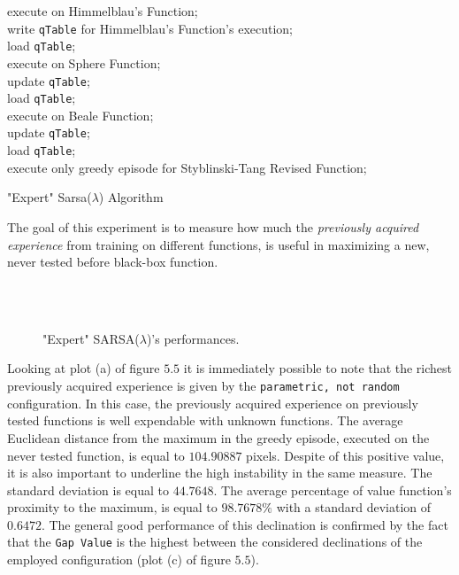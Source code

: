 \begin{algorithm} [h!]

 {
	{execute on Himmelblau's Function; \\
		write {\tt qTable} for Himmelblau's Function's execution; \\
		load {\tt qTable}; \\
		execute on Sphere Function; \\
		update {\tt qTable}; \\
		load {\tt qTable}; \\
		execute on Beale Function; \\
		update {\tt qTable}; \\
		load {\tt qTable}; \\
		execute only greedy episode for Styblinski-Tang Revised Function;
	} 
}
	\caption{"Expert" Sarsa($\lambda$) Algorithm} 
	\label{ExpertAlgo}
\end{algorithm}
 
The goal of this experiment is to measure how much the \textit{previously acquired experience} from training on different functions, is useful in maximizing a new, never tested before black-box function.

\begin{figure}[h!]
	\begin{center}
		\\
		 \\
		
	\end{center}
	\caption{
		"Expert" SARSA($\lambda$)'s  performances.
	}
	\label{fig:ExpertResults}
\end{figure}

Looking at plot (a) of figure $5.5$ it is immediately possible to note that the richest previously acquired experience is given by the {\tt parametric, not random} configuration. In this case, the previously acquired experience on previously tested functions is well expendable with unknown functions. The average Euclidean distance from the maximum in the greedy episode, executed on the never tested function, is equal to $104.90887$ pixels. Despite of this positive value, it is also important to underline the high instability in the same measure. The standard deviation is equal to $44.7648$. The average percentage of value function's proximity to the maximum, is  equal to $98.7678\%$ with a standard deviation of $0.6472$. The general good performance of this declination is confirmed by the fact that the {\tt Gap Value} is the highest between the considered declinations of the employed configuration (plot (c) of figure $5.5$). 

